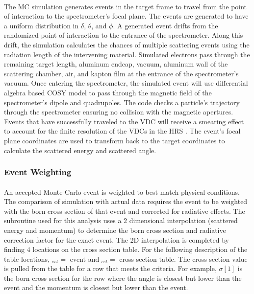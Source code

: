 \paragraph{}The MC simulation generates events in the target frame to travel from the point of interaction to the spectrometer's focal plane. The events are generated to have a uniform distribution in $\delta$, $\theta$, and $\phi$. A generated event drifts from the randomized point of interaction to the entrance of the spectrometer. Along this drift, the simulation calculates the chances of multiple scattering events using the radiation length of the intervening material. Simulated electrons pass through the remaining target length, aluminum endcap, vacuum, aluminum wall of the scattering chamber, air, and kapton film at the entrance of the spectrometer's vacuum. Once entering the spectrometer, the simulated event will use differential algebra based COSY model to pass through the magnetic field of the spectrometer's dipole and quadrupoles. The code checks a particle's trajectory through the spectrometer ensuring no collision with the magnetic apertures.  Events that have successfully traveled to the VDC will receive a smearing effect to account for the finite resolution of the VDCs in the HRS \cite{HallA}. The event's focal plane coordinates are used to transform back to the target coordinates to calculate the scattered energy and scattered angle.\\ 
\subsubsection{Event Weighting}
\paragraph{}An accepted Monte Carlo event is weighted to best match physical conditions. The comparison of simulation with actual data requires the event to be weighted with the born cross section of that event and corrected for radiative effects. The subroutine used for this analysis uses a 2 dimensional interpolation (scattered energy and momentum) to determine the born cross section and radiative correction factor for the exact event. The 2D interpolation is completed by finding 4 locations on the cross section table. For the following description of the table locations, $_{evt} =$ event and $_{cst} =$ cross section table. The cross section value is pulled from the table for a row that meets the criteria. For example, $\sigma[1]$ is the born cross section for the row where the angle is closest but lower than the event and the momentum is closest but lower than the event. 

